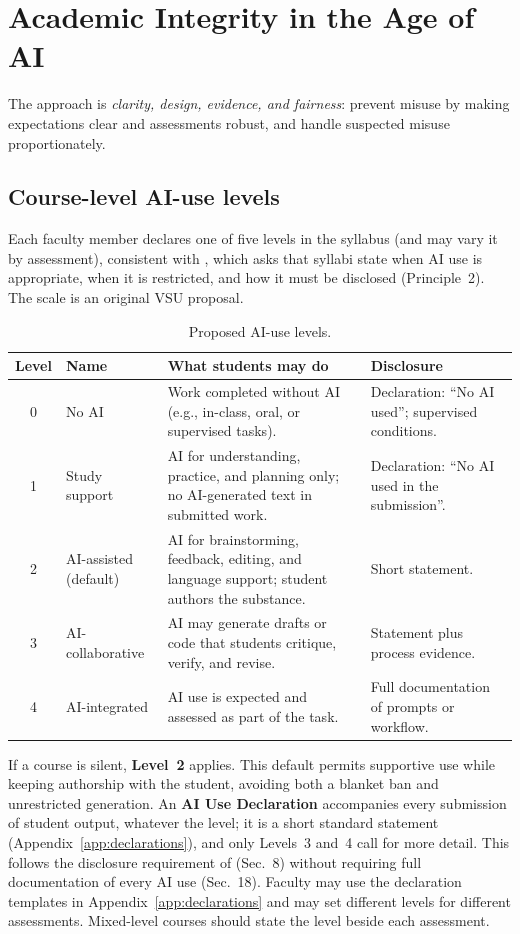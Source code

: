 \section{Academic Integrity in the Age of AI}\label{sec:integrity}

The approach is \emph{clarity, design, evidence, and fairness}: prevent misuse by making expectations clear and assessments robust, and handle suspected misuse proportionately.

\subsection{Course-level AI-use levels}
Each faculty member declares one of five levels in the syllabus (and may vary it by assessment), consistent with \cmo{}, which asks that syllabi state when AI use is appropriate, when it is restricted, and how it must be disclosed (Principle~2). The scale is an original VSU proposal.

\begin{table}[ht]
\centering
\caption{Proposed AI-use levels.}
\small
\begin{tabular}{@{}cp{3.0cm}p{5.8cm}p{4.2cm}@{}}
\toprule
Level & Name & What students may do & Disclosure \\
\midrule
0 & No AI & Work completed without AI (e.g., in-class, oral, or supervised tasks). & Declaration: ``No AI used''; supervised conditions. \\
1 & Study support & AI for understanding, practice, and planning only; no AI-generated text in submitted work. & Declaration: ``No AI used in the submission''. \\
2 & AI-assisted (default) & AI for brainstorming, feedback, editing, and language support; student authors the substance. & Short statement. \\
3 & AI-collaborative & AI may generate drafts or code that students critique, verify, and revise. & Statement plus process evidence. \\
4 & AI-integrated & AI use is expected and assessed as part of the task. & Full documentation of prompts or workflow. \\
\bottomrule
\end{tabular}
\end{table}

If a course is silent, \textbf{Level~2} applies. This default permits supportive use while keeping authorship with the student, avoiding both a blanket ban and unrestricted generation. An \textbf{AI Use Declaration} accompanies every submission of student output, whatever the level; it is a short standard statement (Appendix~\ref{app:declarations}), and only Levels~3 and~4 call for more detail. This follows the disclosure requirement of \cmo{} (Sec.~8) without requiring full documentation of every AI use (Sec.~18). Faculty may use the declaration templates in Appendix~\ref{app:declarations} and may set different levels for different assessments. Mixed-level courses should state the level beside each assessment.

